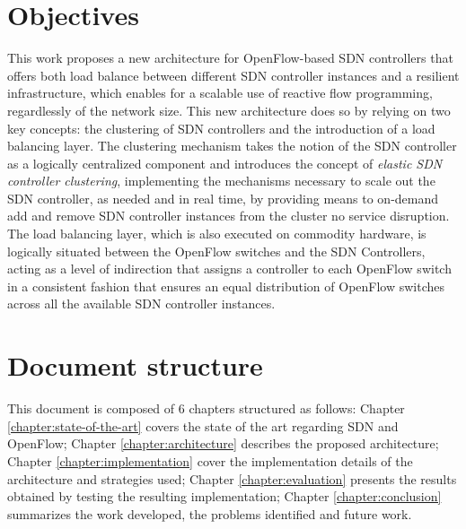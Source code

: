 \section{Objectives}
This work proposes a new architecture for OpenFlow-based \gls{SDN} controllers that offers both load balance between different \gls{SDN} controller instances and a resilient infrastructure, which enables for a scalable use of reactive flow programming, regardlessly of the network size.
This new architecture does so by relying on two key concepts: the clustering of \gls{SDN} controllers and the introduction of a load balancing layer.
The clustering mechanism takes the notion of the \gls{SDN} controller as a logically centralized component and introduces the concept of \emph{elastic \gls{SDN} controller clustering}, implementing the mechanisms necessary to scale out the \gls{SDN} controller, as needed and in real time, by providing means to on-demand add and remove \gls{SDN} controller instances from the cluster no service disruption.
The load balancing layer, which is also executed on commodity hardware, is logically situated between the OpenFlow switches and the SDN Controllers, acting as a level of indirection that assigns a controller to each OpenFlow switch in a consistent fashion that ensures an equal distribution of OpenFlow switches across all the available SDN controller instances.\\
%
\section{Document structure}
This document is composed of 6 chapters structured as follows: Chapter \ref{chapter:state-of-the-art} covers the state of the art regarding \gls{SDN} and OpenFlow; Chapter \ref{chapter:architecture} describes the proposed architecture; Chapter \ref{chapter:implementation} cover the implementation details of the architecture and strategies used; Chapter \ref{chapter:evaluation} presents the results obtained by testing the resulting implementation; Chapter \ref{chapter:conclusion} summarizes the work developed, the problems identified and future work.